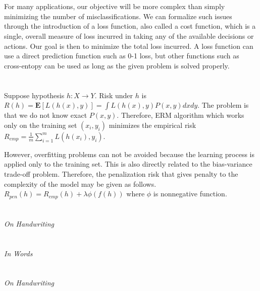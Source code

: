\documentclass[11pt,a4paper]{article}
\begin{document}
\section{}

For many applications, our objective will be more complex than simply minimizing the number of misclassifications. We can formalize such issues through the introduction of a loss function, also called a cost function, which is a single, overall measure of loss incurred in taking any of the available decisions or actions. Our goal is then to minimize the total loss incurred. A loss function can use a direct prediction function such as 0-1 loss, but other functions such as cross-entopy can be used as long as the given problem is solved properly.

\section{}

Suppose hypothesis \(h : X \rightarrow Y\). Risk under \(h\) is \(R(h)=\mathbf{E}[L(h(x), y)]=\int L(h(x), y)P(x, y)dxdy\). The problem is that we do not know exact \(P(x, y)\). Therefore, ERM algorithm which works only on the training set \((x_i, y_i)\) minimizes the empirical risk \(R_{emp} = \frac{1}{m}\sum_{i=1}^{m}L(h(x_i), y_i)\).

However, overfitting problems can not be avoided because the learning process is applied only to the training set. This is also directly related to the bias-variance trade-off problem. Therefore, the penalization risk that gives penalty to the complexity of the model may be given as follows. \( R_{pen}(h)= R_{emp}(h) + \lambda \phi(f(h))\) where \(\phi\) is nonnegative function.

\section{}

\emph{On Handwriting}

\section{}

\emph{In Words}

\section{}

\emph{On Handwriting}
\end{document}
